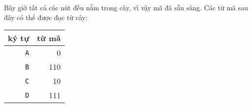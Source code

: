 Bây giờ tất cả các nút đều nằm trong cây, vì vậy mã đã sẵn sàng.
Các từ mã sau đây có thể được đọc từ cây:
\begin{center}
\begin{tabular}{rr}
ký tự & từ mã \\
\hline
\texttt{A} & 0 \\
\texttt{B} & 110 \\
\texttt{C} & 10 \\
\texttt{D} & 111 \\
\end{tabular}
\end{center}
